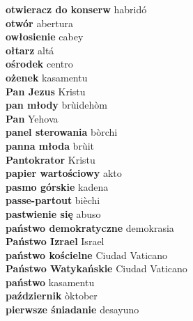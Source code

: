\textbf{ otwieracz do konserw  } habridó \\
\textbf{ otwór  } abertura \\
\textbf{ owłosienie  } cabey \\
\textbf{ ołtarz  } altá \\
\textbf{ ośrodek  } centro \\
\textbf{ ożenek  } kasamentu \\
\textbf{ Pan Jezus  } Kristu \\
\textbf{ pan młody  } brùidehòm \\
\textbf{ Pan  } Yehova \\
\textbf{ panel sterowania  } bòrchi \\
\textbf{ panna młoda  } brùit \\
\textbf{ Pantokrator  } Kristu \\
\textbf{ papier wartościowy  } akto \\
\textbf{ pasmo górskie  } kadena \\
\textbf{ passe-partout  } bièchi \\
\textbf{ pastwienie się  } abuso \\
\textbf{ państwo demokratyczne  } demokrasia \\
\textbf{ Państwo Izrael  } Israel \\
\textbf{ państwo kościelne  } Ciudad Vaticano \\
\textbf{ Państwo Watykańskie  } Ciudad Vaticano \\
\textbf{ państwo  } kasamentu \\
\textbf{ październik  } òktober \\
\textbf{ pierwsze śniadanie  } desayuno \\
